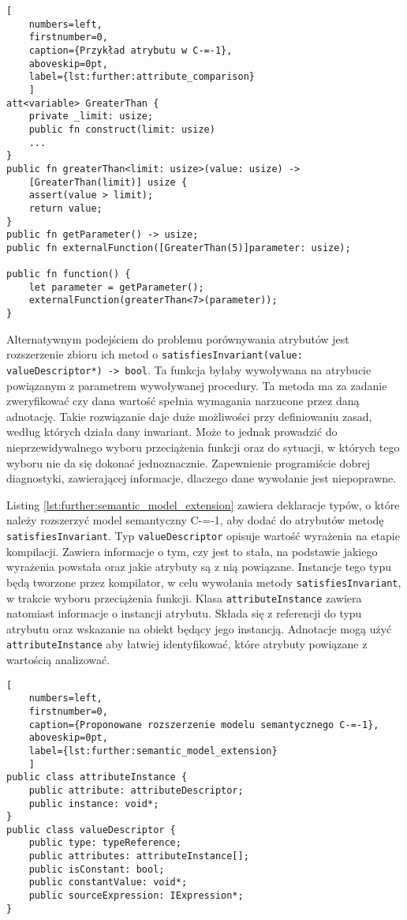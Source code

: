 \begin{lstlisting}[
	numbers=left,
	firstnumber=0,
	caption={Przykład atrybutu w C-=-1},
	aboveskip=0pt,
	label={lst:further:attribute_comparison}
	]
att<variable> GreaterThan {
	private _limit: usize;
	public fn construct(limit: usize)
	...
}
public fn greaterThan<limit: usize>(value: usize) -> 
	[GreaterThan(limit)] usize {
	assert(value > limit);
	return value;
}
public fn getParameter() -> usize;
public fn externalFunction([GreaterThan(5)]parameter: usize);

public fn function() {
	let parameter = getParameter();
	externalFunction(greaterThan<7>(parameter));
}
\end{lstlisting}

Alternatywnym podejściem do problemu porównywania atrybutów jest rozszerzenie zbioru ich metod o \lstinline{satisfiesInvariant(value: valueDescriptor*) -> bool}.
Ta funkcja byłaby wywoływana na atrybucie powiązanym z parametrem wywoływanej procedury.
Ta metoda ma za zadanie zweryfikować czy dana wartość spełnia wymagania narzucone przez daną adnotację.
Takie rozwiązanie daje duże możliwości przy definiowaniu zasad, według których działa dany inwariant.
Może to jednak prowadzić do nieprzewidywalnego wyboru przeciążenia funkcji oraz do sytuacji, w których tego wyboru nie da się dokonać jednoznacznie.
Zapewnienie programiście dobrej diagnostyki, zawierającej informacje, dlaczego dane wywołanie jest niepoprawne.

Listing \ref{lst:further:semantic_model_extension} zawiera deklaracje typów, o które należy rozszerzyć model semantyczny C-=-1, aby dodać do atrybutów metodę \lstinline{satisfiesInvariant}.
Typ \lstinline{valueDescriptor} opisuje wartość wyrażenia na etapie kompilacji.
Zawiera informacje o tym, czy jest to stała, na podstawie jakiego wyrażenia powstała oraz jakie atrybuty są z nią powiązane.
Instancje tego typu będą tworzone przez kompilator, w celu wywołania metody \lstinline{satisfiesInvariant}, w trakcie wyboru przeciążenia funkcji.
Klasa \lstinline{attributeInstance} zawiera natomiast informacje o instancji atrybutu.
Składa się z referencji do typu atrybutu oraz wskazanie na obiekt będący jego instancją.
Adnotacje mogą użyć \lstinline{attributeInstance} aby łatwiej identyfikować, które atrybuty powiązane z wartością analizować.

\begin{minipage}{\textwidth}
	
\begin{lstlisting}[
	numbers=left,
	firstnumber=0,
	caption={Proponowane rozszerzenie modelu semantycznego C-=-1},
	aboveskip=0pt,
	label={lst:further:semantic_model_extension}
	]
public class attributeInstance {
	public attribute: attributeDescriptor;
	public instance: void*;
}
public class valueDescriptor {
	public type: typeReference;
	public attributes: attributeInstance[];
	public isConstant: bool;
	public constantValue: void*;
	public sourceExpression: IExpression*;
}
\end{lstlisting}
	
\end{minipage}

